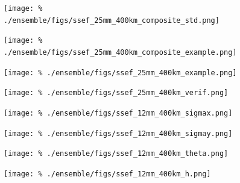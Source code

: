 \clearpage
\begin{figure}[cc]
    \centering
    \texttt{[image: \%
    ./ensemble/figs/ssef\_25mm\_400km\_composite\_std.png]}\\
    \caption{}
    \label{ssef-25mm-400km-std}
\end{figure}


\clearpage
\begin{figure}[cc]
    \centering
    \texttt{[image: \%
    ./ensemble/figs/ssef\_25mm\_400km\_composite\_example.png]}\\
    \caption{}
    \label{ssef-25mm-400km-composite}
\end{figure}


\clearpage
\begin{figure}[cc]
    \centering
    \texttt{[image: \%
    ./ensemble/figs/ssef\_25mm\_400km\_example.png]}\\
    \caption{}
    \label{ssef-25mm-400km-example}
\end{figure}


\clearpage
\begin{figure}[cc]
    \centering
    \texttt{[image: \%
    ./ensemble/figs/ssef\_25mm\_400km\_verif.png]}\\
    \caption{}
    \label{ssef-25mm-400km-verif}
\end{figure}




\clearpage
\begin{figure}[cc]
    \centering
    \texttt{[image: \%
    ./ensemble/figs/ssef\_12mm\_400km\_sigmax.png]}\\
    \caption{}
    \label{sigmax-12mm-400km-dist}
\end{figure}


\clearpage
\begin{figure}[cc]
    \centering
    \texttt{[image: \%
    ./ensemble/figs/ssef\_12mm\_400km\_sigmay.png]}\\
    \caption{}
    \label{sigmay-12mm-400km-dist}
\end{figure}


\clearpage
\begin{figure}[cc]
    \centering
    \texttt{[image: \%
    ./ensemble/figs/ssef\_12mm\_400km\_theta.png]}\\
    \caption{}
    \label{theta-12mm-400km-dist}
\end{figure}


\clearpage
\begin{figure}[cc]
    \centering
    \texttt{[image: \%
    ./ensemble/figs/ssef\_12mm\_400km\_h.png]}\\
    \caption{}
    \label{h-12mm-400km-dist}
\end{figure}


